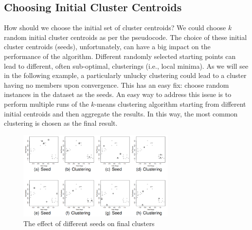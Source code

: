 \documentclass[a4paper,11pt]{article}
\begin{document}
\subsection{Choosing Initial Cluster Centroids}
How should we choose the initial set of cluster centroids?
We could choose $k$ random initial cluster centroids as per the pseudocode.
The choice of these initial cluster centroids (seeds), unfortunately, can have a big impact on the performance of the algorithm.
Different randomly selected starting points can lead to different, often sub-optimal, clusterings (i.e., local minima).
As we will see in the following example, a particularly unlucky clustering could lead to a cluster having no members upon convergence.
This has an easy fix: choose random instances in the dataset as the seeds.
An easy way to address this issue is to perform multiple runs of the $k$-means clustering algorithm starting from different initial centroids and then aggregate the results.
In this way, the most common clustering is chosen as the final result.

\begin{figure}[H]
    \centering
    \includegraphics[width=0.7\textwidth]{images/differentseeds.png}
    \caption{ The effect of different seeds on final clusters }
\end{figure}
\end{document}
